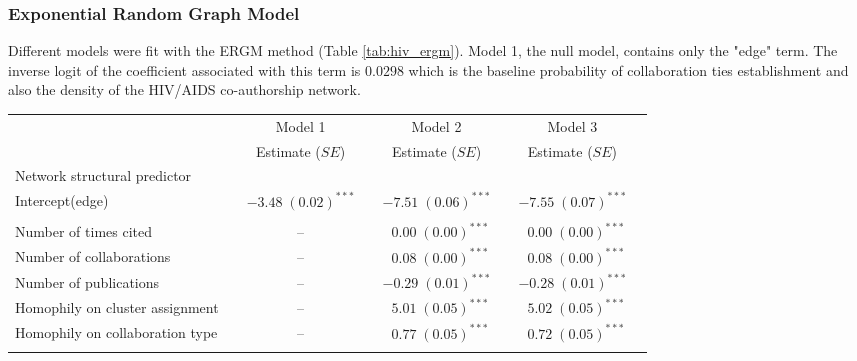 \pagebreak
\subsubsection{Exponential Random Graph Model}
\label{sec:hiv_results_ergm}
Different models were fit with the ERGM method (Table \ref{tab:hiv_ergm}). Model 1, the null model, contains only the "edge" term. The inverse logit of the coefficient associated with this term is $0.0298$ which is the baseline probability of collaboration ties establishment and also the density of the HIV/AIDS co-authorship network.

\begin{table}
\begin{center}
\hspace*{-1cm}
\small
\begin{tabular}{@{}lcclclcl@{}}
\toprule
           &  & Model 1 &  & Model 2  &  & Model 3\\ \cmidrule{3-3} \cmidrule{5-5} \cmidrule{7-7}            &  & Estimate ($SE$) &  & Estimate ($SE$)  &  & Estimate ($SE$) \\ \midrule
           Network structural predictor &  &   &  &  &  \\
\hspace{10pt}Intercept(edge) & & $-3.48 \; (0.02)^{***}$ & & $-7.51 \; (0.06)^{***}$ & & $-7.55 \; (0.07)^{***}$ \\ \\
Number of times cited        & &       --  & & $\hspace{6pt}0.00 \; (0.00)^{***}$ &  & $\hspace{6pt}0.00 \; (0.00)^{***}$  \\
Number of collaborations     & &  --  & & $\hspace{6pt}0.08 \; (0.00)^{***}$ &  & $\hspace{6pt}0.08 \; (0.00)^{***}$  \\
Number of publications       & &  --  & & $-0.29 \; (0.01)^{***}$ & & $-0.28 \; (0.01)^{***}$ \\
Homophily on cluster assignment &  &   --  &  & $\hspace{6pt}5.01 \; (0.05)^{***}$ &  & $\hspace{6pt}5.02 \; (0.05)^{***}$  \\
Homophily on collaboration type   &   & -- &   & $\hspace{6pt}0.77 \; (0.05)^{***}$ &  & $\hspace{6pt}0.72 \; (0.05)^{***}$  \\ \\

\end{tabular}
\end{center}
\end{table}
